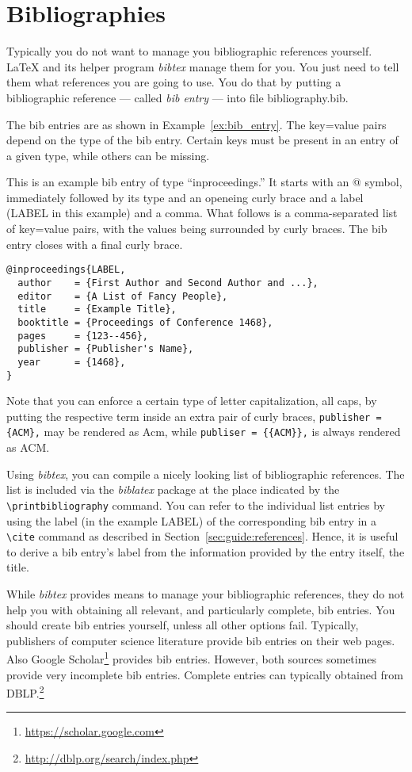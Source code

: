 \section{Bibliographies}
\label{sec:guide:bibliographies}

Typically you do not want to manage you bibliographic references yourself.
\LaTeX{} and its helper program \emph{bibtex} manage them for you.
You just need to tell them what references you are going to use.
You do that by putting a bibliographic reference --- called \emph{bib entry}
--- into file \mbox{bibliography.bib}. 

The bib entries are as shown in Example~\ref{ex:bib_entry}.
The key=value pairs depend on the type of the bib entry.
Certain keys must be present in an entry of a given type, while others can be
missing.
\begin{example}
\label{ex:bib_entry}
This is an example bib entry of type ``inproceedings.'' It starts with an @
symbol, immediately followed by its type and an openeing curly brace and a
label (LABEL in this example) and a comma.
What follows is a comma-separated list of key=value pairs, with the values
being surrounded by curly braces.
The bib entry closes with a final curly brace.
\begin{verbatim}
@inproceedings{LABEL,
  author    = {First Author and Second Author and ...},
  editor    = {A List of Fancy People},
  title     = {Example Title},
  booktitle = {Proceedings of Conference 1468},
  pages     = {123--456},
  publisher = {Publisher's Name},
  year      = {1468},
}
\end{verbatim}
Note that you can enforce a certain type of letter capitalization, \ie{} all
caps, by putting the respective term inside an extra pair of curly braces,
\eg{} \verb+publisher = {ACM},+ may be rendered as Acm, while 
\verb+publiser = {{ACM}},+ is always rendered as ACM.
\end{example}

Using \emph{bibtex}, you can compile a nicely looking list of bibliographic
references.
The list is included via the \emph{biblatex} package at the place indicated by
the \verb+\printbibliography+ command.
You can refer to the individual list entries by using the label (in the example
LABEL) of the corresponding bib entry in a \verb+\cite+ command as described in
Section~\ref{sec:guide:references}.
Hence, it is useful to derive a bib entry's label from the information provided
by the entry itself, \eg{} the title.

While \emph{bibtex} provides means to manage your bibliographic references,
they do not help you with obtaining all relevant, and particularly complete,
bib entries. 
You should create bib entries yourself, unless all other options fail.
Typically, publishers of computer science literature provide bib entries on
their web pages.
Also Google Scholar\footnote{\url{https://scholar.google.com}} provides bib
entries.
However, both sources sometimes provide very incomplete bib entries.
Complete entries can typically obtained from
DBLP.\footnote{\url{http://dblp.org/search/index.php}}

